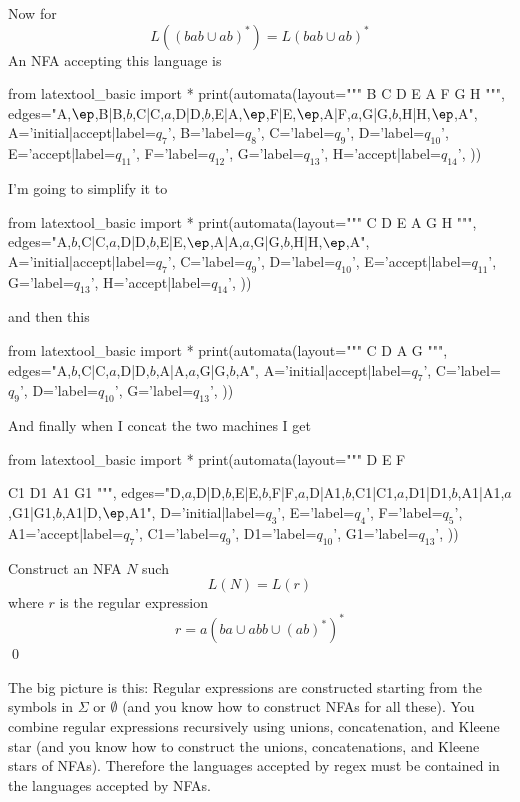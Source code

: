 Now for 
\[
L((bab \cup ab)^* ) 
= 
L(bab \cup ab)^* 
\]
An NFA accepting this language is
\begin{python}
from latextool_basic import *
print(automata(layout="""
   B  C  D  E
A 
   F  G  H
""",
edges="A,$\ep$,B|B,$b$,C|C,$a$,D|D,$b$,E|A,$\ep$,F|E,$\ep$,A|F,$a$,G|G,$b$,H|H,$\ep$,A",
A='initial|accept|label=$q_7$',
B='label=$q_8$',
C='label=$q_9$',
D='label=$q_{10}$',
E='accept|label=$q_{11}$',
F='label=$q_{12}$',
G='label=$q_{13}$',
H='accept|label=$q_{14}$',
))
\end{python}
I'm going to simplify it to
\begin{python}
from latextool_basic import *
print(automata(layout="""
      C  D  E
   A 
      G  H
""",
edges="A,$b$,C|C,$a$,D|D,$b$,E|E,$\ep$,A|A,$a$,G|G,$b$,H|H,$\ep$,A",
A='initial|accept|label=$q_7$',
C='label=$q_9$',
D='label=$q_{10}$',
E='accept|label=$q_{11}$',
G='label=$q_{13}$',
H='accept|label=$q_{14}$',
))
\end{python}
and then this
\begin{python}
from latextool_basic import *
print(automata(layout="""
      C  D
   A 
      G
""",
edges="A,$b$,C|C,$a$,D|D,$b$,A|A,$a$,G|G,$b$,A",
A='initial|accept|label=$q_7$',
C='label=$q_9$',
D='label=$q_{10}$',
G='label=$q_{13}$',
))
\end{python}
And finally when I concat the two machines I get

\begin{python}
from latextool_basic import *
print(automata(layout="""
   D  E  F

      C1 D1
   A1 
      G1
""",
edges="D,$a$,D|D,$b$,E|E,$b$,F|F,$a$,D|A1,$b$,C1|C1,$a$,D1|D1,$b$,A1|A1,$a$,G1|G1,$b$,A1|D,$\ep$,A1",
D='initial|label=$q_3$',
E='label=$q_4$',
F='label=$q_5$',
A1='accept|label=$q_7$',
C1='label=$q_9$',
D1='label=$q_{10}$',
G1='label=$q_{13}$',
))
\end{python}



\newpage
\begin{ex}
Construct an NFA $N$ such 
\[
L(N) = L(r)
\]
where $r$ is the regular expression
\[
r = a (ba \cup abb \cup (ab)^*)^*
\]
\qed
\end{ex}


\newpage
The big picture is this:
Regular expressions are constructed starting from the symbols in $\Sigma$
or $\emptyset$
(and you know how to construct NFAs for all these).
You combine regular expressions recursively using
unions, concatenation, and Kleene star (and you know how to 
construct the unions, concatenations, and Kleene stars of NFAs).
Therefore the languages accepted by regex must be contained in the 
languages accepted by NFAs.

